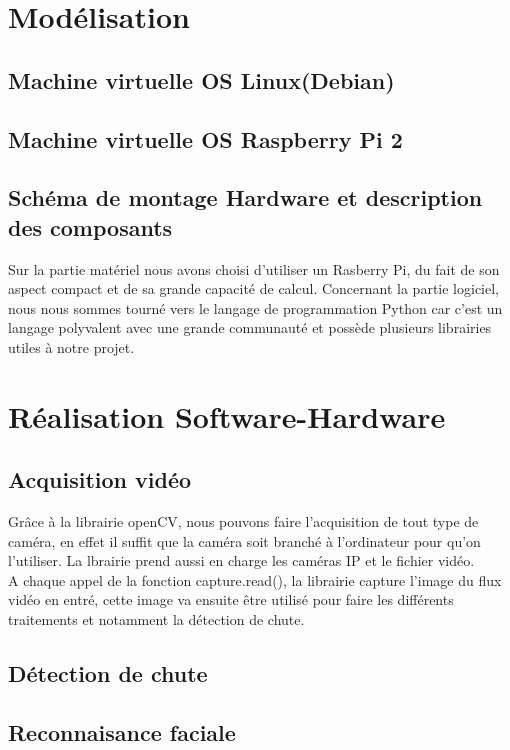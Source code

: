 \documentclass[a4paper]{report}
\begin{document}
    \chapter{Modélisation}
        \section{Machine virtuelle OS Linux(Debian)}
        \section{Machine virtuelle OS Raspberry Pi 2}
        \section{Schéma de montage Hardware et description des composants}

    Sur la partie matériel nous avons choisi d'utiliser un Rasberry Pi, du fait de son aspect compact et de sa grande capacité de calcul. Concernant la partie logiciel, nous nous sommes tourné vers le langage de programmation Python car c'est un langage polyvalent avec une grande communauté et possède plusieurs librairies utiles à notre projet.
    
    \chapter{Réalisation Software-Hardware}
        \section{Acquisition vidéo}
            Grâce à la librairie openCV, nous pouvons faire l'acquisition de tout type de caméra, en effet il suffit que la caméra soit branché à l'ordinateur pour qu'on l'utiliser. La lbrairie prend aussi en charge les caméras IP et le fichier vidéo.
            \\
            A chaque appel de la fonction capture.read(), la librairie capture l'image du flux vidéo en entré, cette image va ensuite être utilisé pour faire les différents traitements et notamment la détection de chute.

        \section{Détection de chute}
        \section{Reconnaisance faciale}
\end{document}

